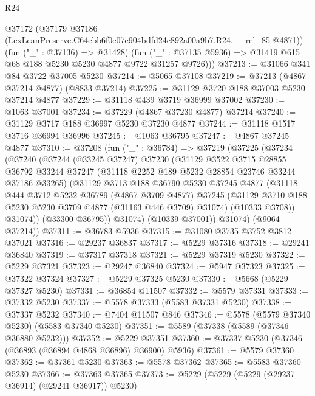 \begin{lexlean}{R24}
\begin{coremodule}
      @37172
        (@37179 @37186 (LexLeanPreserve.C64ebb6f0c07e904bdfd24c892a00a9b7.R24.__rel_85 @4871))
        (fun ("_" : @37136) => @31428)
        (fun ("_" : @37135 @5936) => @31419 @615 @68 @188 @5230 @5230 @4877 @9722 @31257 @9726)))
@37213 := @31066 @341 @84 @3722 @37005 @5230
@37214 := @5065 @37108
@37219 := @37213 (@4867 @37214 @4877) (@8833 @37214)
@37225 := @31129 @3720 @188 @37003 @5230 @37214 @4877
@37229 := @31118 @439 @3719 @36999 @37002
@37230 := @1063 @37001
@37234 := @37229 (@4867 @37230 @4877) @37214
@37240 := @31129 @3717 @188 @36997 @5230 @37230 @4877
@37244 := @31118 @1517 @3716 @36994 @36996
@37245 := @1063 @36795
@37247 := @4867 @37245 @4877
@37310 := @37208
    (fun ("_" : @36784) =>
    @37219
      (@37225
        (@37234
          (@37240
            (@37244
              (@33245 @37247)
              @37230
              (@31129
                @3522
                @3715
                @28855
                @36792
                @33244
                @37247
                (@31118 @2252 @189 @5232 @28854 @23746 @33244 @37186 @33265)
                (@31129
                  @3713
                  @188
                  @36790
                  @5230
                  @37245
                  @4877
                  (@31118
                    @444
                    @3712
                    @5232
                    @36789
                    (@4867 @3709 @4877)
                    @37245
                    (@31129 @3710 @188 @5230 @5230 @3709 @4877 (@31163 @446 @3709) @31074)
                    (@10333 @3708))
                  @31074))
              (@33300 @36795))
            @31074)
          (@10339 @37001))
        @31074)
      (@9064 @37214))
@37311 := @36783 @5936
@37315 := @31080 @3735 @3752 @3812 @37021
@37316 := @29237 @36837
@37317 := @5229 @37316
@37318 := @29241 @36840
@37319 := @37317 @37318
@37321 := @5229 @37319 @5230
@37322 := @5229 @37321
@37323 := @29247 @36840
@37324 := @5947 @37323
@37325 := @37322 @37324
@37327 := @5229 @37325 @5230
@37330 := @5668 (@5229 @37327 @5230)
@37331 := @36854 @11507
@37332 := @5579 @37331
@37333 := @37332 @5230
@37337 := @5578 @37333 (@5583 @37331 @5230)
@37338 := @37337 @5232
@37340 := @7404 @11507 @846
@37346 := @5578 (@5579 @37340 @5230) (@5583 @37340 @5230)
@37351 := @5589 (@37338 (@5589 (@37346 @36880 @5232)))
@37352 := @5229 @37351
@37360 := @37337 @5230 (@37346 (@36893 (@36894 @4868 @36896) @36900) @5936)
@37361 := @5579 @37360
@37362 := @37361 @5230
@37363 := @5578 @37362
@37365 := @5583 @37360 @5230
@37366 := @37363 @37365
@37373 := @5229 (@5229 (@5229 (@29237 @36914) (@29241 @36917)) @5230)

\end{coremodule}
\end{lexlean}
